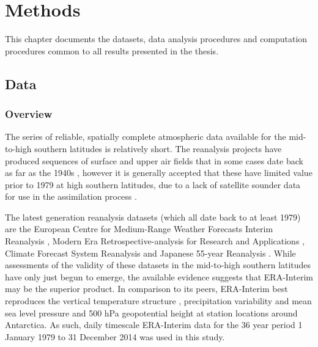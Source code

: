 
\chapter{Methods}\label{c:methods}


\begin{synopsis}
This chapter documents the datasets, data analysis procedures and computation procedures common to all results presented in the thesis.
\end{synopsis}

\section{Data}\label{s:data}


\subsection{Overview}

The series of reliable, spatially complete atmospheric data available for the mid-to-high southern latitudes is relatively short. The reanalysis projects have produced sequences of surface and upper air fields that in some cases date back as far as the 1940s \citep{Kistler2001,Uppala2005,Kobayashi2015}, however it is generally accepted that these have limited value prior to 1979 at high southern latitudes, due to a lack of satellite sounder data for use in the assimilation process \citep{Hines2000}.

The latest generation reanalysis datasets (which all date back to at least 1979) are the European Centre for Medium-Range Weather Forecasts Interim Reanalysis \citep[ERA-Interim;][]{Dee2011}, Modern Era Retrospective-analysis for Research and Applications \citep[MERRA;][]{Rienecker2011}, Climate Forecast System Reanalysis \citep[CFSR;][]{Saha2010} and Japanese 55-year Reanalysis \citep[JRA-55;][]{Kobayashi2015}. While assessments of the validity of these datasets in the mid-to-high southern latitudes have only just begun to emerge, the available evidence suggests that ERA-Interim may be the superior product. In comparison to its peers, ERA-Interim best reproduces the vertical temperature structure \citep{Screen2012}, precipitation variability \citep{Bromwich2011,Nicolas2011} and mean sea level pressure and 500 hPa geopotential height at station locations \citep{Bracegirdle2012} around Antarctica. As such, daily timescale ERA-Interim data for the 36 year period 1 January 1979 to 31 December 2014 was used in this study.

